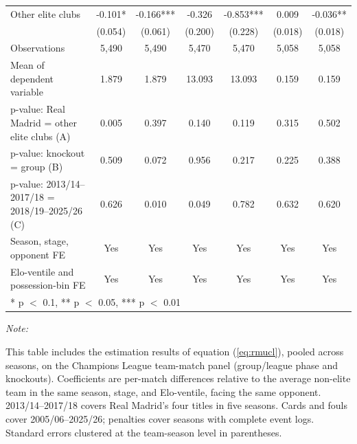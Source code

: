 \begin{table}[!h]
{\begin{threeparttable}
\begin{tabular}[t]{lcccccc}
\hspace{1em}Other elite clubs & -0.101* & -0.166*** & -0.326 & -0.853*** & 0.009 & -0.036**\\
\hspace{1em} & (0.054) & (0.061) & (0.200) & (0.228) & (0.018) & (0.018)\\
\hspace{1em}Observations & 5,490 & 5,490 & 5,470 & 5,470 & 5,058 & 5,058\\
Mean of dependent variable & 1.879 & 1.879 & 13.093 & 13.093 & 0.159 & 0.159\\
p-value: Real Madrid = other elite clubs (A) & 0.005 & 0.397 & 0.140 & 0.119 & 0.315 & 0.502\\
p-value: knockout = group (B) & 0.509 & 0.072 & 0.956 & 0.217 & 0.225 & 0.388\\
p-value: 2013/14--2017/18 = 2018/19--2025/26 (C) & 0.626 & 0.010 & 0.049 & 0.782 & 0.632 & 0.620\\
Season, stage, opponent FE & Yes & Yes & Yes & Yes & Yes & Yes\\
Elo-ventile and possession-bin FE & Yes & Yes & Yes & Yes & Yes & Yes\\
\bottomrule
\multicolumn{7}{l}{\rule{0pt}{1em}* p $<$ 0.1, ** p $<$ 0.05, *** p $<$ 0.01}\\
\end{tabular}
\begin{tablenotes}[para]
\item \textit{Note: } 
\item This table includes the estimation results of equation (\ref{eq:rmucl}), pooled across seasons, on the Champions League team-match panel (group/league phase and knockouts). Coefficients are per-match differences relative to the average non-elite team in the same season, stage, and Elo-ventile, facing the same opponent. 2013/14--2017/18 covers Real Madrid's four titles in five seasons. Cards and fouls cover 2005/06--2025/26; penalties cover seasons with complete event logs. Standard errors clustered at the team-season level in parentheses.
\end{tablenotes}
\end{threeparttable}}
\end{table}
